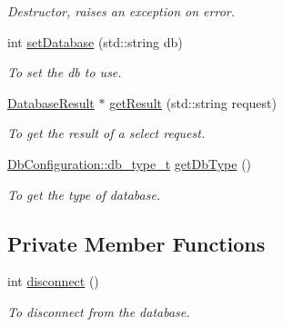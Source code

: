 \begin{DoxyCompactItemize}
\begin{DoxyCompactList}\small\item\em Destructor, raises an exception on error. \item\end{DoxyCompactList}\item 
int \hyperlink{classOracleDatabase_a937a096b286c4e6738ea5d314aabe109}{setDatabase} (std::string db)
\begin{DoxyCompactList}\small\item\em To set the db to use. \item\end{DoxyCompactList}\item 
\hyperlink{classDatabaseResult}{DatabaseResult} $\ast$ \hyperlink{classOracleDatabase_a399070863f94605bc2e520c968e3edbe}{getResult} (std::string request)
\begin{DoxyCompactList}\small\item\em To get the result of a select request. \item\end{DoxyCompactList}\item 
\hyperlink{classDbConfiguration_a4a57e43a5017a5c4833a784a994c91cf}{DbConfiguration::db\_\-type\_\-t} \hyperlink{classOracleDatabase_a4079e91290576c8d71bc062ffa20330a}{getDbType} ()
\begin{DoxyCompactList}\small\item\em To get the type of database. \item\end{DoxyCompactList}\end{DoxyCompactItemize}
\subsection*{Private Member Functions}
\begin{DoxyCompactItemize}
\item 
int \hyperlink{classOracleDatabase_a9839467588dcecbdb4c4582903379346}{disconnect} ()
\begin{DoxyCompactList}\small\item\em To disconnect from the database. \item\end{DoxyCompactList}\end{DoxyCompactItemize}
